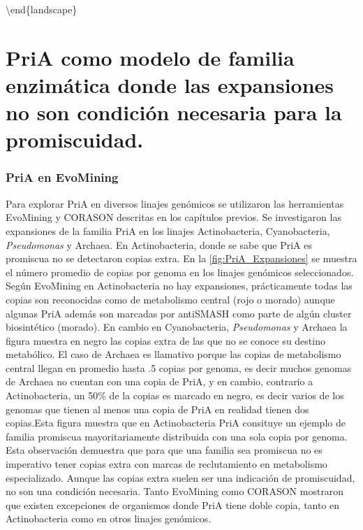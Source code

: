 \documentclass[12pt,twoside]{reedthesis}
\begin{document}
  \textbackslash{}end\{landscape\} \normalsize
  
  \section{PriA como modelo de familia enzimática donde las expansiones no
  son condición necesaria para la
  promiscuidad.}\label{pria-como-modelo-de-familia-enzimatica-donde-las-expansiones-no-son-condicion-necesaria-para-la-promiscuidad.}
  
  \subsubsection{PriA en EvoMining}\label{pria-en-evomining}
  
  Para explorar PriA en diversos linajes genómicos se utilizaron las
  herramientas EvoMining y CORASON descritas en los capítulos previos. Se
  investigaron las expansiones de la familia PriA en los linajes
  Actinobacteria, Cyanobacteria, \emph{Pseudomonas} y Archaea. En
  Actinobacteria, donde se sabe que PriA es promiscua no se detectaron
  copias extra. En la \autoref{fig:PriA_Expansiones} se muestra el número
  promedio de copias por genoma en los linajes genómicos seleccionados.
  Según EvoMining en Actinobacteria no hay expansiones, prácticamente
  todas las copias son reconocidas como de metabolismo central (rojo o
  morado) aunque algunas PriA además son marcadas por antiSMASH como parte
  de algún cluster biosintético (morado). En cambio en Cyanobacteria,
  \emph{Pseudomonas} y Archaea la figura muestra en negro las copias extra
  de las que no se conoce su destino metabólico. El caso de Archaea es
  llamativo porque las copias de metabolismo central llegan en promedio
  hasta .5 copias por genoma, es decir muchos genomas de Archaea no
  cuentan con una copia de PriA, y en cambio, contrario a Actinobacteria,
  un 50\% de la copias es marcado en negro, es decir varios de los genomas
  que tienen al menos una copia de PriA en realidad tienen dos copias.Esta
  figura muestra que en Actinobacteria PriA consituye un ejemplo de
  familia promiscua mayoritariamente distribuida con una sola copia por
  genoma. Esta observación demuestra que para que una familia sea
  promiscua no es imperativo tener copias extra con marcas de
  reclutamiento en metabolismo especializado. Aunque las copias extra
  suelen ser una indicación de promiscuidad, no son una condición
  necesaria. Tanto EvoMining como CORASON mostraron que existen
  excepciones de organismos donde PriA tiene doble copia, tanto en
  Actinobacteria como en otros linajes genómicos.
  
\end{document}
